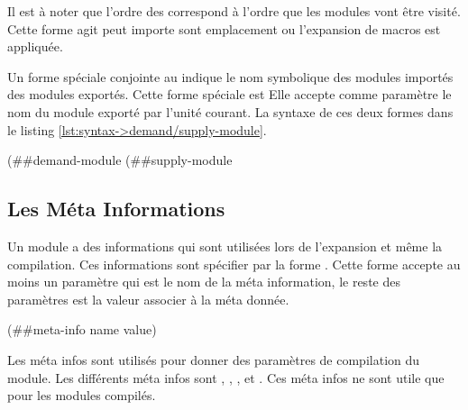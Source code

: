 Il est à noter que l'ordre des  correspond à l'ordre
que les modules vont être visité. Cette forme agit peut importe sont emplacement
ou l'expansion de macros est appliquée.



Un forme spéciale conjointe au  indique le nom
symbolique des modules importés des modules exportés. Cette forme spéciale est
 Elle accepte comme paramètre le nom du module exporté
par l'unité courant.  La syntaxe de ces deux formes dans le listing
\ref{lst:syntax->demand/supply-module}.\\
\begin{center}
  \begin{mplisting}{0.8}
(##demand-module %
(##supply-module %
\end{mplisting}
\end{center}

\subsection{Les Méta Informations}
Un module a des informations qui sont utilisées lors de l'expansion
et même la compilation. Ces informations sont spécifier par la forme
. Cette forme accepte au moins un paramètre qui
est le nom de la méta information, le reste des paramètres est la valeur
associer à la méta donnée.

\begin{center}
  \begin{mplisting}{0.5}
(##meta-info name value)
\end{mplisting}
\end{center}

Les méta infos sont utilisés pour donner des paramètres de compilation
du module. Les différents méta infos sont ,
, , 
et . Ces méta infos ne sont utile que pour les modules
compilés.

